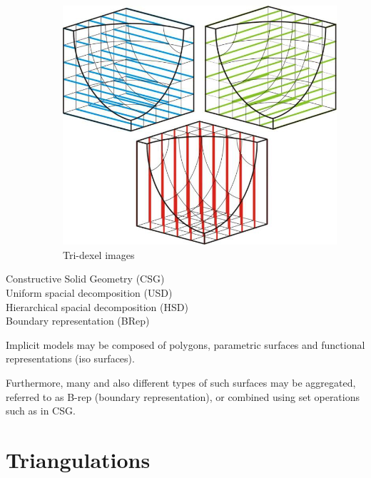 \begin{description}
	\begin{figure}
		\centering
		\includegraphics[width=\textwidth]{images/tridexels}
		\caption{Tri-dexel images}
		\label{fig:tri_dexel_image}
	\end{figure}

	\item[Constructive Solid Geometry (CSG)]
	
	\item[Uniform spacial decomposition (USD)]
	
	\item[Hierarchical spacial decomposition (HSD)]
	
	\item[Boundary representation (BRep)]
	
\end{description}

Implicit models may be composed of polygons, parametric surfaces and functional representations (iso surfaces).

Furthermore, many and also different types of such surfaces may be aggregated, referred to as B-rep (boundary representation), or combined using set operations such as in CSG.



\section{Triangulations}
\label{sec:definitions}

